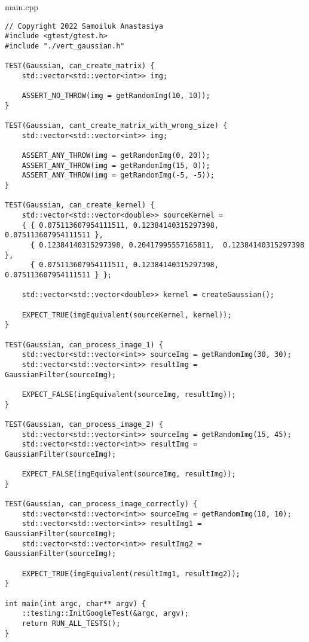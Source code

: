 \documentclass{report}
\begin{document}
\par main.cpp
\begin{lstlisting}
// Copyright 2022 Samoiluk Anastasiya
#include <gtest/gtest.h>
#include "./vert_gaussian.h"

TEST(Gaussian, can_create_matrix) {
    std::vector<std::vector<int>> img;

    ASSERT_NO_THROW(img = getRandomImg(10, 10));
}

TEST(Gaussian, cant_create_matrix_with_wrong_size) {
    std::vector<std::vector<int>> img;

    ASSERT_ANY_THROW(img = getRandomImg(0, 20));
    ASSERT_ANY_THROW(img = getRandomImg(15, 0));
    ASSERT_ANY_THROW(img = getRandomImg(-5, -5));
}

TEST(Gaussian, can_create_kernel) {
    std::vector<std::vector<double>> sourceKernel =
    { { 0.075113607954111511, 0.12384140315297398, 0.075113607954111511 },
      { 0.12384140315297398, 0.20417995557165811,  0.12384140315297398 },
      { 0.075113607954111511, 0.12384140315297398, 0.075113607954111511 } };

    std::vector<std::vector<double>> kernel = createGaussian();

    EXPECT_TRUE(imgEquivalent(sourceKernel, kernel));
}

TEST(Gaussian, can_process_image_1) {
    std::vector<std::vector<int>> sourceImg = getRandomImg(30, 30);
    std::vector<std::vector<int>> resultImg = GaussianFilter(sourceImg);

    EXPECT_FALSE(imgEquivalent(sourceImg, resultImg));
}

TEST(Gaussian, can_process_image_2) {
    std::vector<std::vector<int>> sourceImg = getRandomImg(15, 45);
    std::vector<std::vector<int>> resultImg = GaussianFilter(sourceImg);

    EXPECT_FALSE(imgEquivalent(sourceImg, resultImg));
}

TEST(Gaussian, can_process_image_correctly) {
    std::vector<std::vector<int>> sourceImg = getRandomImg(10, 10);
    std::vector<std::vector<int>> resultImg1 = GaussianFilter(sourceImg);
    std::vector<std::vector<int>> resultImg2 = GaussianFilter(sourceImg);

    EXPECT_TRUE(imgEquivalent(resultImg1, resultImg2));
}

int main(int argc, char** argv) {
    ::testing::InitGoogleTest(&argc, argv);
    return RUN_ALL_TESTS();
}
\end{lstlisting}
\newpage
\end{document}
